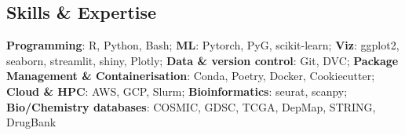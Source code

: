 \documentclass[margin,line]{resume}
\begin{document}
\begin{resume}
    \section{\mysidestyle Skills \& Expertise} 

\textbf{Programming}: R, Python, Bash; 
\textbf{ML}: Pytorch, PyG, scikit-learn;
    \textbf{Viz}: ggplot2, seaborn, streamlit, shiny, Plotly;
    \textbf{Data \& version control}: Git, DVC;
    \textbf{Package Management \& Containerisation}: Conda, Poetry, Docker, Cookiecutter; \textbf{Cloud \& HPC}: AWS, GCP, Slurm;
    \textbf{Bioinformatics}: seurat, scanpy; \textbf{Bio/Chemistry databases}: COSMIC, GDSC, TCGA, DepMap, STRING, DrugBank
    

\end{resume}
\end{document}
